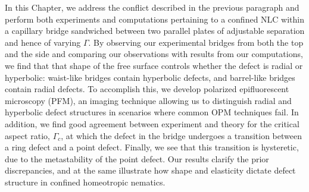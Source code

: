 In this Chapter, we address the conflict described in the previous paragraph and perform both experiments and computations pertaining to a confined NLC within a capillary bridge sandwiched between two parallel plates of adjustable separation and hence of varying $\Gamma$.
By observing our experimental bridges from both the top and the side and comparing our observations with results from our computations, we find that that shape of the free surface controls whether the defect is radial or hyperbolic: waist-like bridges contain hyperbolic defects, and barrel-like bridges contain radial defects.
To accomplish this, we develop polarized epifluorescent microscopy (PFM), an imaging technique allowing us to distinguish radial and hyperbolic defect structures in scenarios where common OPM techniques fail.
In addition, we find good agreement between experiment and theory for the critical aspect ratio, $\Gamma_c$, at which the defect in the bridge undergoes a transition between a ring defect and a point defect.
Finally, we see that this transition is hysteretic, due to the metastability of the point defect.
Our results clarify the prior discrepancies, and at the same illustrate how shape and elasticity dictate defect structure in confined homeotropic nematics.




